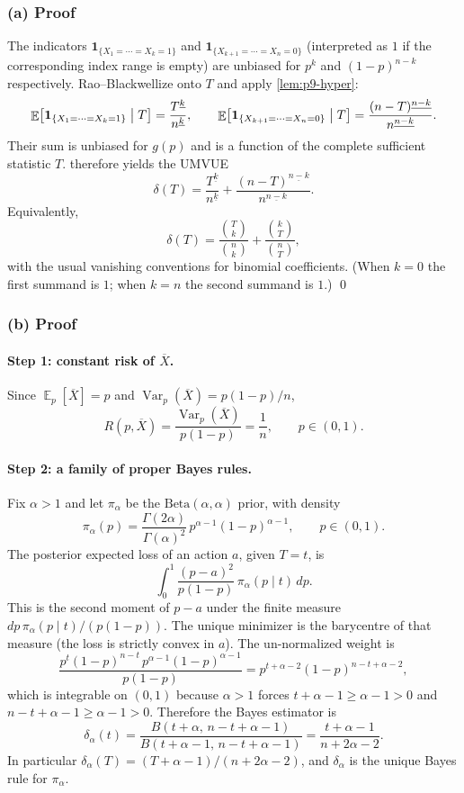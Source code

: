\documentclass[11pt,a4paper]{article}
\DeclareMathOperator{\Var}{Var}
\DeclareMathOperator{\E}{\mathbb{E}}
\begin{document}
\subsubsection{(a) Proof}

The indicators \(\mathbf{1}_{\{X_1=\cdots=X_k=1\}}\) and \(\mathbf{1}_{\{X_{k+1}=\cdots=X_n=0\}}\) (interpreted as \(1\) if the corresponding index range is empty) are unbiased for \(p^k\) and \((1-p)^{n-k}\) respectively. Rao--Blackwellize onto \(T\) and apply \cref{lem:p9-hyper}:
\[
\E\bigl[\mathbf{1}_{\{X_1=\cdots=X_k=1\}}\bigm|T\bigr]
=
\frac{T^{\underline{k}}}{n^{\underline{k}}},
\qquad
\E\bigl[\mathbf{1}_{\{X_{k+1}=\cdots=X_n=0\}}\bigm|T\bigr]
=
\frac{(n-T)^{\underline{n-k}}}{n^{\underline{n-k}}}.
\]
Their sum is unbiased for \(g(p)\) and is a function of the complete sufficient statistic \(T\).  therefore yields the UMVUE
\[
\delta(T)
=
\frac{T^{\underline{k}}}{n^{\underline{k}}}
+
\frac{(n-T)^{\underline{n-k}}}{n^{\underline{n-k}}}.
\]
Equivalently,
\[
\delta(T)
=
\frac{\binom{T}{k}}{\binom{n}{k}}
+
\frac{\binom{k}{T}}{\binom{n}{T}},
\]
with the usual vanishing conventions for binomial coefficients. (When \(k=0\) the first summand is \(1\); when \(k=n\) the second summand is \(1\).)
\qed

\subsubsection{(b) Proof}

\paragraph{Step 1: constant risk of \(\overline{X}\).}
Since \(\E_p[\overline{X}]=p\) and \(\Var_p(\overline{X})=p(1-p)/n\),
\[
R(p,\overline{X})
=
\frac{\Var_p(\overline{X})}{p(1-p)}
=
\frac{1}{n},
\qquad
p\in(0,1).
\]

\paragraph{Step 2: a family of proper Bayes rules.}
Fix \(\alpha>1\) and let \(\pi_\alpha\) be the \(\mathrm{Beta}(\alpha,\alpha)\) prior, with density
\[
\pi_\alpha(p)
=
\frac{\Gamma(2\alpha)}{\Gamma(\alpha)^2}\,p^{\alpha-1}(1-p)^{\alpha-1},
\qquad
p\in(0,1).
\]
The posterior expected loss of an action \(a\), given \(T=t\), is
\[
\int_0^1\frac{(p-a)^2}{p(1-p)}\,\pi_\alpha(p\mid t)\,dp.
\]
This is the second moment of \(p-a\) under the finite measure \(dp\,\pi_\alpha(p\mid t)/(p(1-p))\). The unique minimizer is the barycentre of that measure (the loss is strictly convex in \(a\)). The un-normalized weight is
\[
\frac{p^t(1-p)^{n-t}\,p^{\alpha-1}(1-p)^{\alpha-1}}{p(1-p)}
=
p^{t+\alpha-2}(1-p)^{n-t+\alpha-2},
\]
which is integrable on \((0,1)\) because \(\alpha>1\) forces \(t+\alpha-1\ge\alpha-1>0\) and \(n-t+\alpha-1\ge\alpha-1>0\). Therefore the Bayes estimator is
\[
\delta_\alpha(t)
=
\frac{B(t+\alpha,\,n-t+\alpha-1)}{B(t+\alpha-1,\,n-t+\alpha-1)}
=
\frac{t+\alpha-1}{n+2\alpha-2}.
\]
In particular \(\delta_\alpha(T)=(T+\alpha-1)/(n+2\alpha-2)\), and \(\delta_\alpha\) is the unique Bayes rule for \(\pi_\alpha\).
\end{document}

